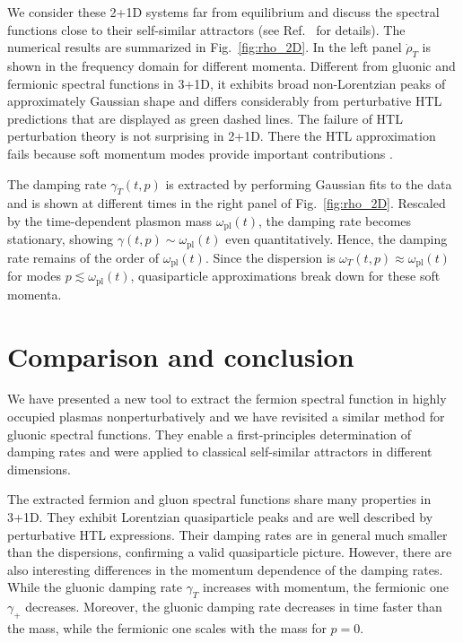 \documentclass[]{webofc}
\newcommand{\mrm}{\mathrm}
\newcommand{\wplas}{\omega_{\mrm{pl}}}
\newcommand{\fig}{Fig.~}
\newcommand{\re}{Ref.~}
\begin{document}
We consider these 2+1D systems far from equilibrium and discuss the spectral functions close to their self-similar attractors (see \re\cite{Boguslavski:2021buh} for details). The numerical results are summarized in \fig\ref{fig:rho_2D}. In the left panel $\dot\rho_T$ is shown in the frequency domain for different momenta. Different from gluonic and fermionic spectral functions in 3+1D, it exhibits broad non-Lorentzian peaks of approximately Gaussian shape and differs considerably from perturbative HTL predictions that are displayed as green dashed lines. 
The failure of HTL perturbation theory is not surprising in 2+1D. There the HTL approximation fails because soft momentum modes provide important contributions 
\cite{Boguslavski:2019fsb}.

The damping rate $\gamma_T(t,p)$ is extracted by performing Gaussian fits to the data and is shown at different times in the right panel of \fig\ref{fig:rho_2D}. Rescaled by the time-dependent plasmon mass $\wplas(t)$, the damping rate becomes stationary, showing $\gamma(t,p) \sim \wplas(t)$ even quantitatively. Hence, the damping rate remains of the order of $\wplas(t)$. Since the dispersion is $\omega_T(t,p) \approx \wplas(t)$ for modes $p \lesssim \wplas(t)$, quasiparticle approximations break down for these soft momenta. 



\section{Comparison and conclusion}
\label{sec:conclusion}

We have presented a new tool to extract the fermion spectral function in highly occupied plasmas nonperturbatively and we have revisited a similar method for gluonic spectral functions. They enable a first-principles determination of damping rates and were applied to classical self-similar attractors in different dimensions. 

The extracted fermion and gluon spectral functions share many properties in 3+1D. They exhibit Lorentzian quasiparticle peaks and are well described by perturbative HTL expressions. Their damping rates are in general much smaller than the dispersions, confirming a valid quasiparticle picture. However, there are also interesting differences in the momentum dependence of the damping rates. While the gluonic damping rate $\gamma_{T}$ increases with momentum, the fermionic one $\gamma_{+}$ decreases. Moreover, the gluonic damping rate decreases in time faster than the mass, while the fermionic one scales with the mass for $p=0$. 
\end{document}
